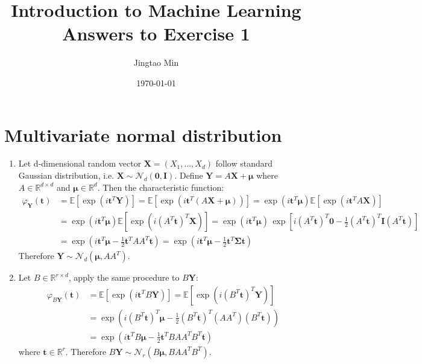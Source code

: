 \documentclass[a4paper, 10pt]{article}
\title{\bfseries Introduction to Machine Learning \\ Answers to Exercise 1}
\author{Jingtao Min}
\date{\today}
\begin{document}
\maketitle

\section{Multivariate normal distribution}

\begin{enumerate}[label=(\alph*)]

\item Let d-dimensional random vector $\mathbf{X}=(X_1, ..., X_d)$ follow standard Gaussian distribution, i.e. $\mathbf{X}\sim \mathcal{N}_d(\mathbf{0}, \mathbf{I})$. Define $\mathbf{Y} = A \mathbf{X} + \bm{\mu}$ where $A \in \mathbb{R}^{d\times d}$ and $\bm{\mu}\in \mathbb{R}^d$. Then the characteristic function:
\begin{equation}
    \begin{aligned}
        \varphi_\mathbf{Y}(\mathbf{t}) &= \mathbb{E}\left[\exp\left(i\mathbf{t}^T \mathbf{Y}\right)\right] = \mathbb{E}\left[\exp \left(i \mathbf{t}^T (A\mathbf{X} + \bm{\mu}) \right)\right] = \exp \left(i\mathbf{t}^T \bm{\mu}\right) \mathbb{E}\left[\exp\left(i\mathbf{t}^T A \mathbf{X}\right)\right] \\ 
        &= \exp \left(i\mathbf{t}^T \bm{\mu}\right) \mathbb{E}\left[\exp\left(i\left(A^T \mathbf{t}\right)^T \mathbf{X} \right)\right] = \exp\left(i\mathbf{t}^T \bm{\mu}\right) \, \exp\left[i \left(A^T \mathbf{t}\right)^T \mathbf{0} - \frac{1}{2} \left(A^T \mathbf{t}\right)^T \mathbf{I} \left(A^T \mathbf{t}\right) \right] \\ 
        &= \exp\left(i\mathbf{t}^T \bm{\mu} -\frac{1}{2} \mathbf{t}^T AA^T \mathbf{t}\right) = \exp\left(i\mathbf{t}^T \bm{\mu} -\frac{1}{2} \mathbf{t}^T \bm{\Sigma} \mathbf{t}\right)
    \end{aligned}
\end{equation}
Therefore $\mathbf{Y} \sim \mathcal{N}_d (\bm{\mu}, AA^T)$.

\item Let $B \in \mathbb{R}^{r\times d}$, apply the same procedure to $B \mathbf{Y}$:
\begin{equation}
    \begin{aligned}
        \varphi_{B\mathbf{Y}}(\mathbf{t}) &= \mathbb{E}\left[\exp\left(i\mathbf{t}^T B \mathbf{Y}\right)\right] = \mathbb{E} \left[\exp \left(i (B^T \mathbf{t})^T \mathbf{Y}\right)\right] \\ 
        &= \exp\left(i(B^T \mathbf{t})^T \bm{\mu} - \frac{1}{2} (B^T \mathbf{t})^T (AA^T) (B^T \mathbf{t})\right) \\ 
        &= \exp\left(i\mathbf{t}^T B\bm{\mu} - \frac{1}{2} \mathbf{t}^T BAA^TB^T \mathbf{t} \right)
    \end{aligned}
\end{equation}
where $\mathbf{t}\in \mathbb{R}^r$. Therefore $B\mathbf{Y} \sim \mathcal{N}_r (B\bm{\mu}, BAA^TB^T)$.


\end{enumerate}
\end{document}

